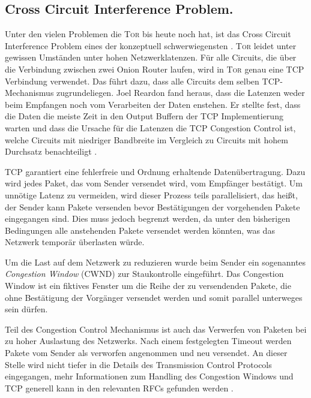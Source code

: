 \documentclass[fleqn,envcountsame,runningheads,10pt,a4paper]{llncs}
\begin{document}
\subsection{Cross Circuit Interference Problem.}
\label{sec:crosscircuitinterference} 

Unter den vielen Problemen die \textsc{Tor} bis heute noch hat, ist das Cross Circuit Interference Problem eines der konzeptuell schwerwiegensten \cite{tor_improvements}.
\textsc{Tor} leidet unter gewissen Umständen unter hohen Netzwerklatenzen.
Für alle Circuits, die über die Verbindung zwischen zwei Onion Router laufen, wird in \textsc{Tor} genau eine TCP Verbindung verwendet.
Das führt dazu, dass alle Circuits dem selben TCP-Mechanismus zugrundeliegen.
Joel Reardon fand heraus, dass die Latenzen weder beim Empfangen noch vom Verarbeiten der Daten enstehen.
Er stellte fest, dass die Daten die meiste Zeit in den Output Buffern der TCP Implementierung warten und dass die Ursache für die Latenzen die TCP Congestion Control ist, welche Circuits mit niedriger Bandbreite im Vergleich zu Circuits mit hohem Durchsatz benachteiligt \cite{tcp-over-dtls-thesis,tcp-over-dtls}.

TCP garantiert eine fehlerfreie und Ordnung erhaltende Datenübertragung. Dazu wird jedes Paket, das vom Sender versendet wird, vom Empfänger bestätigt.
Um unnötige Latenz zu vermeiden, wird dieser Prozess teils parallelisiert, das heißt, der Sender kann Pakete versenden bevor Bestätigungen der vorgehenden Pakete eingegangen sind. Dies muss jedoch begrenzt werden, da unter den bisherigen Bedingungen alle anstehenden Pakete versendet werden könnten, was das Netzwerk temporär überlasten würde.

Um die Last auf dem Netzwerk zu reduzieren wurde beim Sender ein sogenanntes \textit{Congestion Window} (CWND) zur Staukontrolle eingeführt. Das Congestion Window ist ein fiktives Fenster um die Reihe der zu versendenden Pakete, die ohne Bestätigung der Vorgänger versendet werden und somit parallel unterweges sein dürfen.

Teil des Congestion Control Mechanismus ist auch das Verwerfen von Paketen bei zu hoher Auslastung des Netzwerks. Nach einem festgelegten Timeout werden Pakete vom Sender als verworfen angenommen und neu versendet. An dieser Stelle wird nicht tiefer in die Details des Transmission Control Protocols eingegangen, mehr Informationen zum Handling des Congestion Windows und TCP generell kann in den relevanten RFCs gefunden werden \cite{rfc:tcp, rfc:tcpcc}.
\end{document}
